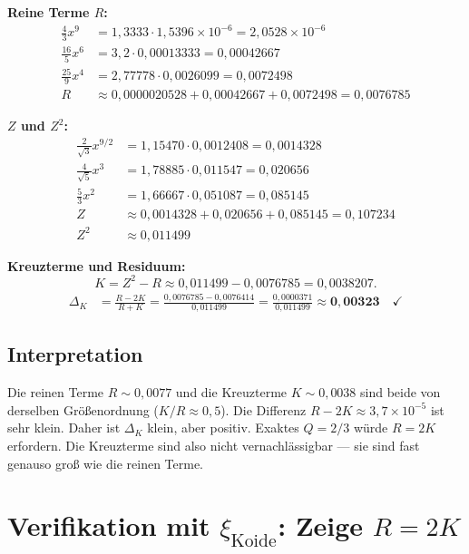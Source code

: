 \textbf{Reine Terme $R$:}
\begin{align*}
  \tfrac{4}{3}x^9 &= 1{,}3333\cdot1{,}5396\times10^{-6}=2{,}0528\times10^{-6} \\
  \tfrac{16}{5}x^6 &= 3{,}2\cdot0{,}00013333=0{,}00042667 \\
  \tfrac{25}{9}x^4 &= 2{,}77778\cdot0{,}0026099=0{,}0072498 \\
  R &\approx 0{,}0000020528+0{,}00042667+0{,}0072498=0{,}0076785
\end{align*}

\textbf{$Z$ und $Z^2$:}
\begin{align*}
  \tfrac{2}{\sqrt{3}}x^{9/2} &= 1{,}15470\cdot0{,}0012408=0{,}0014328 \\
  \tfrac{4}{\sqrt{5}}x^3 &= 1{,}78885\cdot0{,}011547=0{,}020656 \\
  \tfrac{5}{3}x^2 &= 1{,}66667\cdot0{,}051087=0{,}085145 \\
  Z &\approx 0{,}0014328+0{,}020656+0{,}085145=0{,}107234 \\
  Z^2 &\approx 0{,}011499
\end{align*}

\textbf{Kreuzterme und Residuum:}
\[
  K=Z^2-R\approx0{,}011499-0{,}0076785=0{,}0038207.
\]
\begin{align*}
  \Delta_K &= \frac{R-2K}{R+K}
  = \frac{0{,}0076785-0{,}0076414}{0{,}011499}
  = \frac{0{,}0000371}{0{,}011499}
  \approx\mathbf{0{,}00323}\quad\checkmark
\end{align*}

\subsection{Interpretation}

Die reinen Terme $R\sim0{,}0077$ und die Kreuzterme $K\sim0{,}0038$
sind beide von derselben Größenordnung ($K/R\approx0{,}5$).
Die Differenz $R-2K\approx3{,}7\times10^{-5}$ ist sehr klein.
Daher ist $\Delta_K$ klein, aber positiv.
Exaktes $Q=2/3$ würde $R=2K$ erfordern.
Die Kreuzterme sind also nicht vernachlässigbar —
sie sind fast genauso groß wie die reinen Terme.

\section{Verifikation mit $\xi_{\text{Koide}}$: Zeige $R=2K$}


